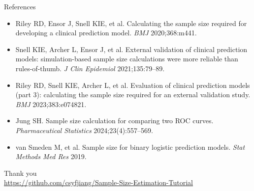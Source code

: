 \documentclass[10pt,aspectratio=169]{beamer}
\begin{document}
\begin{frame}[allowframebreaks]{References}
  \footnotesize
  \begin{itemize}
    \item Riley RD, Ensor J, Snell KIE, et al. Calculating the sample size required for developing a
      clinical prediction model. \emph{BMJ} 2020;368:m441.
    \item Snell KIE, Archer L, Ensor J, et al. External validation of clinical prediction models:
      simulation-based sample size calculations were more reliable than rules-of-thumb.
      \emph{J Clin Epidemiol} 2021;135:79--89.
    \item Riley RD, Snell KIE, Archer L, et al. Evaluation of clinical prediction models (part 3):
      calculating the sample size required for an external validation study.
      \emph{BMJ} 2023;383:e074821.
    \item Jung SH. Sample size calculation for comparing two ROC curves.
      \emph{Pharmaceutical Statistics} 2024;23(4):557--569.
    \item van Smeden M, et al. Sample size for binary logistic prediction models.
      \emph{Stat Methods Med Res} 2019.
  \end{itemize}
\end{frame}

\begin{frame}[standout]
  Thank you\\[2mm]
  {\normalsize \url{https://github.com/csyfjiang/Sample-Size-Estimation-Tutorial}}
\end{frame}
\end{document}
